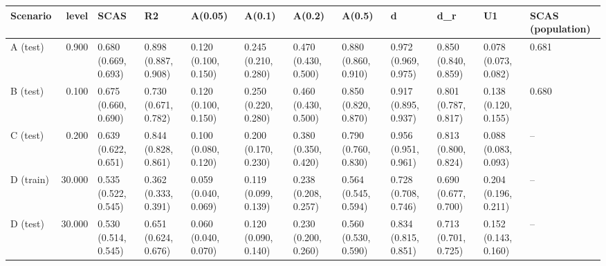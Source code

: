\begin{tabular}{lrllllllllll}
\toprule
Scenario & level & SCAS & R2 & A(0.05) & A(0.1) & A(0.2) & A(0.5) & d & d_r & U1 & SCAS (population) \\
\midrule
A (test) & 0.900 & 0.680 (0.669, 0.693) & 0.898 (0.887, 0.908) & 0.120 (0.100, 0.150) & 0.245 (0.210, 0.280) & 0.470 (0.430, 0.500) & 0.880 (0.860, 0.910) & 0.972 (0.969, 0.975) & 0.850 (0.840, 0.859) & 0.078 (0.073, 0.082) & 0.681 \\
B (test) & 0.100 & 0.675 (0.660, 0.690) & 0.730 (0.671, 0.782) & 0.120 (0.100, 0.150) & 0.250 (0.220, 0.280) & 0.460 (0.430, 0.500) & 0.850 (0.820, 0.870) & 0.917 (0.895, 0.937) & 0.801 (0.787, 0.817) & 0.138 (0.120, 0.155) & 0.680 \\
C (test) & 0.200 & 0.639 (0.622, 0.651) & 0.844 (0.828, 0.861) & 0.100 (0.080, 0.120) & 0.200 (0.170, 0.230) & 0.380 (0.350, 0.420) & 0.790 (0.760, 0.830) & 0.956 (0.951, 0.961) & 0.813 (0.800, 0.824) & 0.088 (0.083, 0.093) & -- \\
D (train) & 30.000 & 0.535 (0.522, 0.545) & 0.362 (0.333, 0.391) & 0.059 (0.040, 0.069) & 0.119 (0.099, 0.139) & 0.238 (0.208, 0.257) & 0.564 (0.545, 0.594) & 0.728 (0.708, 0.746) & 0.690 (0.677, 0.700) & 0.204 (0.196, 0.211) & -- \\
D (test) & 30.000 & 0.530 (0.514, 0.545) & 0.651 (0.624, 0.676) & 0.060 (0.040, 0.070) & 0.120 (0.090, 0.140) & 0.230 (0.200, 0.260) & 0.560 (0.530, 0.590) & 0.834 (0.815, 0.851) & 0.713 (0.701, 0.725) & 0.152 (0.143, 0.160) & -- \\
\bottomrule
\end{tabular}
